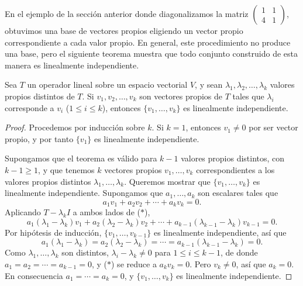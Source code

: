 \documentclass[12pt,a4paper]{book}
\begin{document}
    En el ejemplo de la sección anterior donde diagonalizamos la matriz $\begin{pmatrix}1&1\\4&1\end{pmatrix}$, obtuvimos una base de vectores propios eligiendo un vector propio correspondiente a cada valor propio. En general, este procedimiento no produce una base, pero el siguiente teorema muestra que todo conjunto construido de esta manera es linealmente independiente.

    \begin{teorema}
        Sea $T$ un operador lineal sobre un espacio vectorial $V$, y sean $\lambda_1, \lambda_2, \dots, \lambda_k$ valores propios distintos de $T$. Si $v_1, v_2, \dots, v_k$ son vectores propios de $T$ tales que $\lambda_i$ corresponde a $v_i$ ($1\le i\le k$), entonces $\{v_1,\dots,v_k\}$ es linealmente independiente.
    \end{teorema}

    \begin{proof}
        Procedemos por inducción sobre $k$. Si $k=1$, entonces $v_1\neq 0$ por ser vector propio, y por tanto $\{v_1\}$ es linealmente independiente.

        Supongamos que el teorema es válido para $k-1$ valores propios distintos, con $k-1\geq 1$, y que tenemos $k$ vectores propios $v_1,\dots,v_k$ correspondientes a los valores propios distintos $\lambda_1,\dots,\lambda_k$. Queremos mostrar que $\{v_1,\dots,v_k\}$ es linealmente independiente. Supongamos que $a_1,\dots,a_k$ son escalares tales que
        \begin{equation*}
            a_1v_1+a_2v_2+\cdots+a_kv_k=0. \tag{$*$}
        \end{equation*}
        Aplicando $T-\lambda_k I$ a ambos lados de ($*$),
        \begin{equation*}
            a_1(\lambda_1-\lambda_k)v_1+a_2(\lambda_2-\lambda_k)v_2+\cdots+a_{k-1}(\lambda_{k-1}-\lambda_k)v_{k-1}=0.
        \end{equation*}
        Por hipótesis de inducción, $\{v_1,\dots,v_{k-1}\}$ es linealmente independiente, así que
        \begin{equation*}
            a_1(\lambda_1-\lambda_k)=a_2(\lambda_2-\lambda_k)=\cdots=a_{k-1}(\lambda_{k-1}-\lambda_k)=0.
        \end{equation*}
        Como $\lambda_1,\dots,\lambda_k$ son distintos, $\lambda_i-\lambda_k\neq 0$ para $1\leq i\leq k-1$, de donde $a_1=a_2=\cdots=a_{k-1}=0$, y ($*$) se reduce a $a_kv_k=0$. Pero $v_k\neq 0$, así que $a_k=0$. En consecuencia $a_1=\cdots=a_k=0$, y $\{v_1,\dots,v_k\}$ es linealmente independiente.
    \end{proof}
\end{document}
